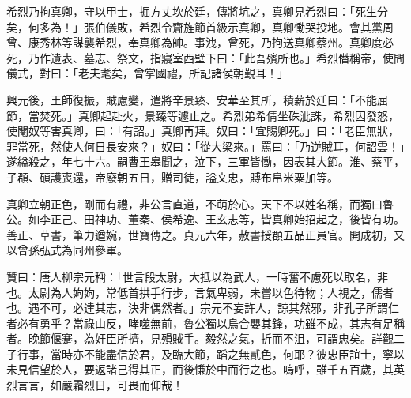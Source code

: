 \begin{pinyinscope}
 希烈乃拘真卿，守以甲士，掘方丈坎於廷，傳將坑之，真卿見希烈曰：「死生分矣，何多為！」張伯儀敗，希烈令齎旌節首級示真卿，真卿慟哭投地。會其黨周曾、康秀林等謀襲希烈，奉真卿為帥。事洩，曾死，乃拘送真卿蔡州。真卿度必死，乃作遺表、墓志、祭文，指寢室西壁下曰：「此吾殯所也。」希烈僭稱帝，使問儀式，對曰：「老夫耄矣，曾掌國禮，所記諸侯朝覲耳！」



 興元後，王師復振，賊慮變，遣將辛景臻、安華至其所，積薪於廷曰：「不能屈節，當焚死。」真卿起赴火，景臻等遽止之。希烈弟希倩坐硃泚誅，希烈因發怒，使閹奴等害真卿，曰：「有詔。」真卿再拜。奴曰：「宜賜卿死。」曰：「老臣無狀，罪當死，然使人何日長安來？」奴曰：「從大梁來。」罵曰：「乃逆賊耳，何詔雲！」遂縊殺之，年七十六。嗣曹王皋聞之，泣下，三軍皆慟，因表其大節。淮、蔡平，子頵、碩護喪還，帝廢朝五日，贈司徒，謚文忠，賻布帛米粟加等。



 真卿立朝正色，剛而有禮，非公言直道，不萌於心。天下不以姓名稱，而獨曰魯公。如李正己、田神功、董秦、侯希逸、王玄志等，皆真卿始招起之，後皆有功。善正、草書，筆力遒婉，世寶傳之。貞元六年，赦書授頵五品正員官。開成初，又以曾孫弘式為同州參軍。



 贊曰：唐人柳宗元稱：「世言段太尉，大抵以為武人，一時奮不慮死以取名，非也。太尉為人姁姁，常低首拱手行步，言氣卑弱，未嘗以色待物；人視之，儒者也。遇不可，必達其志，決非偶然者。」宗元不妄許人，諒其然邪，非孔子所謂仁者必有勇乎？當祿山反，哮噬無前，魯公獨以烏合嬰其鋒，功雖不成，其志有足稱者。晚節偃蹇，為奸臣所擠，見殞賊手。毅然之氣，折而不沮，可謂忠矣。詳觀二子行事，當時亦不能盡信於君，及臨大節，蹈之無貳色，何耶？彼忠臣誼士，寧以未見信望於人，要返諸己得其正，而後慊於中而行之也。嗚呼，雖千五百歲，其英烈言言，如嚴霜烈日，可畏而仰哉！



\end{pinyinscope}